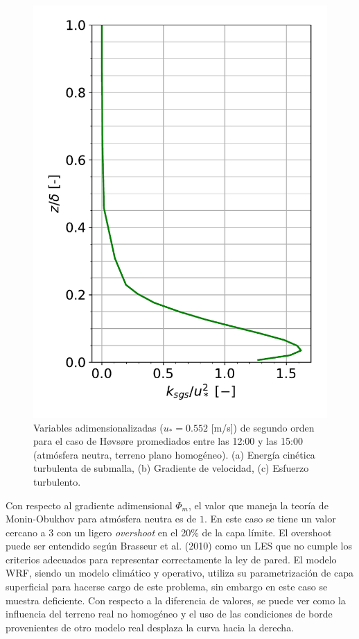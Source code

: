 \begin{figure}[H]
\begin{center}
	\includegraphics[height=0.5\linewidth,page=3,trim={12mm 5mm 3mm 0mm},clip]{Imagenes/06/hov/mean_data}%
	\end{center}
	\caption{Variables adimensionalizadas ($u_* = 0.552$ [m/s]) de segundo orden para el caso de Høvsøre promediados entre las 12:00 y las 15:00 (atmósfera neutra, terreno plano homogéneo). (a) Energía cinética turbulenta de submalla, (b) Gradiente de velocidad, (c) Esfuerzo turbulento. }
	\label{fig:06_hov_mean_secondorder}
\end{figure}

Con respecto al gradiente adimensional $\Phi_m$, el valor que maneja la teoría de Monin-Obukhov para atmósfera neutra es de $1$. En este caso se tiene un valor cercano a $3$ con un ligero \emph{overshoot} en el 20\% de la capa límite. El overshoot puede ser entendido según Brasseur et al. (2010) \cite{doi:10.1063/1.3319073} como un LES que no cumple los criterios adecuados para representar correctamente la ley de pared. El modelo WRF, siendo un modelo climático y operativo, utiliza su parametrización de capa superficial para hacerse cargo de este problema, sin embargo en este caso se muestra deficiente. Con respecto a la diferencia de valores, se puede ver como la influencia del terreno real no homogéneo y el uso de las condiciones de borde provenientes de otro modelo real desplaza la curva hacia la derecha.

